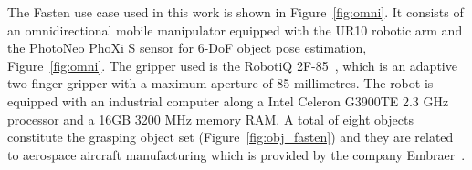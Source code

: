 The Fasten use case used in this work is shown in Figure~\ref{fig:omni}. It consists of an omnidirectional mobile manipulator equipped with the UR10 robotic arm and the PhotoNeo PhoXi S sensor for 6-DoF object pose estimation, Figure~\ref{fig:omni}. The gripper used is the RobotiQ 2F-85~\cite{robotiq_grippers}, which is an adaptive two-finger gripper with a maximum aperture of 85 millimetres. The robot is equipped with an industrial computer along a Intel Celeron G3900TE 2.3 GHz processor and a 16GB 3200 MHz memory RAM. A total of eight objects constitute the grasping object set (Figure~\ref{fig:obj_fasten}) and they are related to aerospace aircraft manufacturing which is provided by the company Embraer~\cite{embraer_pt}.




 \begin{figure}[h!]
\end{figure}
